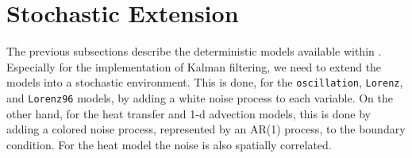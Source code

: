 \section{Stochastic Extension}
The previous subsections describe the deterministic models available within
\oda. Especially for the implementation of Kalman filtering, we need to extend
the models into a stochastic environment. This is done, for the \verb|oscillation|,
\verb|Lorenz|, and \verb|Lorenz96| models, by adding a white noise process to each variable.
On the other hand, for the heat transfer and 1-d advection models, this is done
by adding a colored noise process, represented by an AR(1) process, to the
boundary condition. For the heat model the noise is also spatially correlated.
